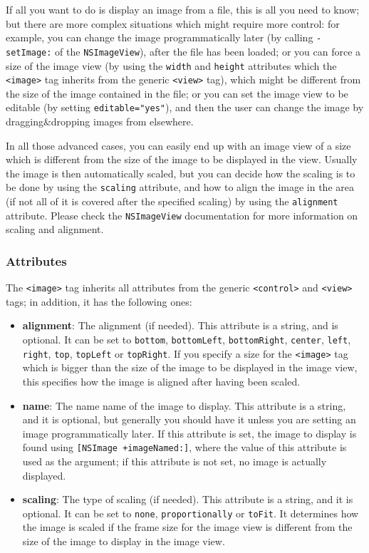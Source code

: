 If all you want to do is display an image from a file, this is all you
need to know; but there are more complex situations which might
require more control: for example, you can change the image
programmatically later (by calling \texttt{-setImage:} of the
\texttt{NSImageView}), after the file has been loaded; or you can
force a size of the image view (by using the \texttt{width} and
\texttt{height} attributes which the \texttt{<image>} tag inherits 
from the generic \texttt{<view>} tag), which might be different from
the size of the image contained in the file; or you can set the image
view to be editable (by setting \texttt{editable="yes"}), and then the
user can change the image by dragging\&dropping images from elsewhere.

In all those advanced cases, you can easily end up with an image view
of a size which is different from the size of the image to be
displayed in the view.  Usually the image is then automatically
scaled, but you can decide how the scaling is to be done by using the
\texttt{scaling} attribute, and how to align the image in the area (if
not all of it is covered after the specified scaling) by using the
\texttt{alignment} attribute.  Please check the \texttt{NSImageView} 
documentation for more information on scaling and alignment.

\subsubsection{Attributes}
The \texttt{<image>} tag inherits all attributes from the generic
\texttt{<control>} and \texttt{<view>} tags; in addition, it has 
the following ones:
\begin{itemize}
\item {\bf alignment}: The alignment (if needed).  This attribute is 
a string, and is optional.  It can be set to \texttt{bottom},
\texttt{bottomLeft}, \texttt{bottomRight}, \texttt{center}, 
\texttt{left}, \texttt{right}, \texttt{top}, \texttt{topLeft} or
\texttt{topRight}.  If you specify a size for the \texttt{<image>} tag 
which is bigger than the size of the image to be displayed in the
image view, this specifies how the image is aligned after having been
scaled.
\item {\bf name}: The name name of the image to display.  This attribute
is a string, and it is optional, but generally you should have it
unless you are setting an image programmatically later.  If this
attribute is set, the image to display is found using \texttt{[NSImage
+imageNamed:]}, where the value of this attribute is used as the
argument; if this attribute is not set, no image is actually
displayed.
\item {\bf scaling}: The type of scaling (if needed).  This attribute 
is a string, and it is optional.  It can be set to \texttt{none},
\texttt{proportionally} or \texttt{toFit}.  It determines how the image
is scaled if the frame size for the image view is different from the
size of the image to display in the image view.
\end{itemize}

